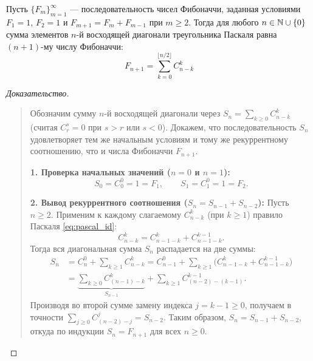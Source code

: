 \begin{theorem}
    Пусть $\{F_m\}_{m=1}^\infty$ --- последовательность чисел Фибоначчи, 
    заданная условиями $F_1 = 1$, $F_2 = 1$ и $F_{m+1} = F_m + F_{m-1}$ 
    при $m \ge 2$. Тогда для любого $n \in \mathbb{N} \cup \{0\}$ сумма элементов 
    $n$-й восходящей диагонали треугольника Паскаля равна $(n + 1)$-му 
    числу Фибоначчи:
    \begin{equation} \label{eq:fib_binom}
        F_{n+1} = \sum_{k=0}^{\lfloor n/2 \rfloor} C_{n-k}^k \tag{12}
    \end{equation}
\end{theorem}

\begin{proof}[Доказательство]~\\
    \begin{quote}
        Обозначим сумму $n$-й восходящей диагонали через 
        $S_n = \sum_{k \ge 0} C_{n-k}^k$ (считая $C_r^s = 0$ при $s > r$ 
        или $s < 0$). Докажем, что последовательность $S_n$ удовлетворяет 
        тем же начальным условиям и тому же рекуррентному соотношению, что 
        и числа Фибоначчи $F_{n+1}$.

        \textbf{1. Проверка начальных значений ($n = 0$ и $n = 1$):}
        \[
            S_0 = C_0^0 = 1 = F_1, \qquad
            S_1 = C_1^0 = 1 = F_2.
        \]

        \textbf{2. Вывод рекуррентного соотношения ($S_{n} = S_{n-1} + S_{n-2}$):} 
        Пусть $n \ge 2$. Применим к каждому слагаемому $C_{n-k}^k$ (при 
        $k \ge 1$) правило Паскаля \eqref{eq:pascal_id}:
        \[
            C_{n-k}^k = C_{n-1-k}^k + C_{n-1-k}^{k-1}.
        \]
        Тогда вся диагональная сумма $S_n$ распадается на две суммы:
        \begin{align*}
            S_n &= C_n^0 + \sum_{k \ge 1} C_{n-k}^k = 
            C_{n-1}^0 + \sum_{k \ge 1} \bigl(C_{n-1-k}^k + C_{n-1-k}^{k-1}\bigr) \\
            &= \underbrace{\sum_{k \ge 0} C_{(n-1)-k}^k}_{S_{n-1}} + 
            \sum_{k \ge 1} C_{(n-2)-(k-1)}^{k-1}.
        \end{align*}
        Производя во второй сумме замену индекса $j = k - 1 \ge 0$, 
        получаем в точности $\sum_{j \ge 0} C_{(n-2)-j}^j = S_{n-2}$. 
        Таким образом, $S_n = S_{n-1} + S_{n-2}$, откуда по индукции 
        $S_n = F_{n+1}$ для всех $n \ge 0$.
    \end{quote}
\end{proof}

